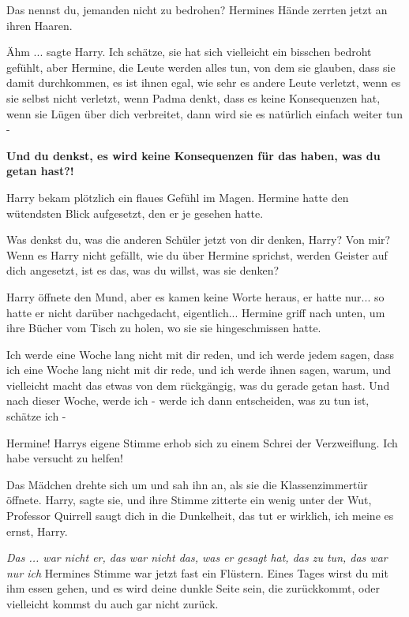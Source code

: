 \glqq{}Das nennst du, jemanden nicht zu bedrohen?\grqq{} Hermines Hände zerrten
jetzt an ihren Haaren.

\glqq{}Ähm ...\grqq{} sagte Harry. \glqq{}Ich schätze, sie hat sich vielleicht ein
bisschen bedroht gefühlt, aber Hermine, die Leute werden alles tun, von dem sie
glauben, dass sie damit durchkommen, es ist ihnen egal, wie sehr es andere Leute
verletzt, wenn es sie selbst nicht verletzt, wenn Padma denkt, dass es keine
Konsequenzen hat, wenn sie Lügen über dich verbreitet, dann wird sie es
natürlich einfach weiter tun -\grqq{}

\glqq{}\textbf{Und du denkst, es wird keine Konsequenzen für das haben, was du
getan hast?!}\grqq{}

Harry bekam plötzlich ein flaues Gefühl im Magen. Hermine hatte den wütendsten
Blick aufgesetzt, den er je gesehen hatte.

\glqq{}Was denkst du, was die anderen Schüler jetzt von dir denken, Harry? Von
mir? Wenn es Harry nicht gefällt, wie du über Hermine sprichst, werden Geister
auf dich angesetzt, ist es das, was du willst, was sie denken?\grqq{}

Harry öffnete den Mund, aber es kamen keine Worte heraus, er hatte nur... so
hatte er nicht darüber nachgedacht, eigentlich... Hermine griff nach unten, um
ihre Bücher vom Tisch zu holen, wo sie sie hingeschmissen hatte.

\glqq{}Ich werde eine Woche lang nicht mit dir reden, und ich werde jedem sagen,
dass ich eine Woche lang nicht mit dir rede, und ich werde ihnen sagen, warum,
und vielleicht macht das etwas von dem rückgängig, was du gerade getan hast. Und
nach dieser Woche, werde ich - werde ich dann entscheiden, was zu tun ist,
schätze ich -\grqq{}

\glqq{}Hermine!\grqq{} Harrys eigene Stimme erhob sich zu einem Schrei der
Verzweiflung. \glqq{}Ich habe versucht zu helfen!\grqq{}

Das Mädchen drehte sich um und sah ihn an, als sie die Klassenzimmertür öffnete.
\glqq{}Harry\grqq{}, sagte sie, und ihre Stimme zitterte ein wenig unter der Wut,
\glqq{}Professor Quirrell saugt dich in die Dunkelheit, das tut er wirklich, ich
meine es ernst, Harry.\grqq{}

\emph{Das ... war nicht er, das war nicht das, was er gesagt hat, das zu tun,
das war nur ich}
Hermines Stimme war jetzt fast ein Flüstern. \glqq{}Eines Tages wirst du mit ihm
essen gehen, und es wird deine dunkle Seite sein, die zurückkommt, oder
vielleicht kommst du auch gar nicht zurück.\grqq{}

